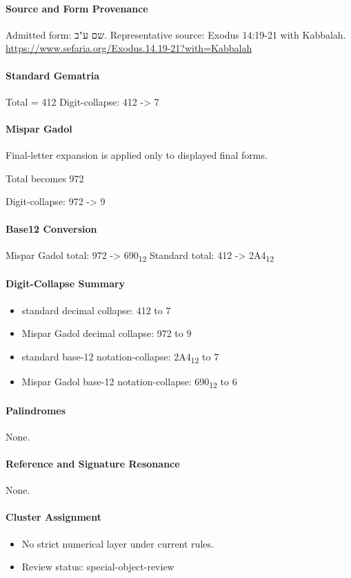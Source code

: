 \paragraph{Source and Form Provenance}
Admitted form: שם ע"ב.
Representative source: Exodus 14:19-21 with Kabbalah.
\url{https://www.sefaria.org/Exodus.14.19-21?with=Kabbalah}
\paragraph{Standard Gematria}
Total = 412
Digit-collapse: 412 -> 7
\paragraph{Mispar Gadol}
Final-letter expansion is applied only to displayed final forms.

Total becomes 972

Digit-collapse: 972 -> 9
\paragraph{Base12 Conversion}
Mispar Gadol total: 972 -> 690\textsubscript{12}
Standard total: 412 -> 2A4\textsubscript{12}
\paragraph{Digit-Collapse Summary}
\begin{itemize}
\item standard decimal collapse: 412 to 7
\item Mispar Gadol decimal collapse: 972 to 9
\item standard base-12 notation-collapse: 2A4\textsubscript{12} to 7
\item Mispar Gadol base-12 notation-collapse: 690\textsubscript{12} to 6
\end{itemize}
\paragraph{Palindromes}
None.
\paragraph{Reference and Signature Resonance}
None.
\paragraph{Cluster Assignment}
\begin{itemize}
\item No strict numerical layer under current rules.
\item Review status: special-object-review
\end{itemize}

